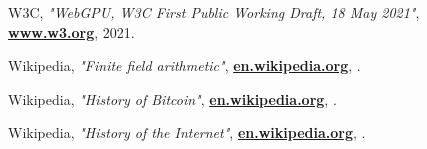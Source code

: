 \documentclass[10pt,a4paper,final]{article}
\let\oldhref\href
\renewcommand{\href}[2]{\oldhref{#1}{\bfseries#2}}
\begin{document}
\begin{thebibliography}{999}
	W3C,
	\emph{"WebGPU, W3C First Public Working Draft, 18 May 2021"},
	\href{https://www.w3.org/TR/2021/WD-webgpu-20210518/}{www.w3.org},
	2021.

	Wikipedia,
	\emph{"Finite field arithmetic"},
	\href{https://en.wikipedia.org/wiki/Finite_field_arithmetic}{en.wikipedia.org},
	\the\year{}.

	Wikipedia,
	\emph{"History of Bitcoin"},
	\href{https://en.wikipedia.org/wiki/History_of_bitcoin}{en.wikipedia.org},
	\the\year{}.

	Wikipedia,
	\emph{"History of the Internet"},
	\href{https://en.wikipedia.org/wiki/History_of_the_Internet}{en.wikipedia.org},
	\the\year{}.

\end{thebibliography}

\clearpage
\printglossaries
\end{document}
